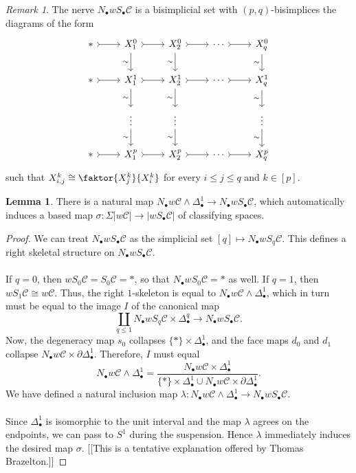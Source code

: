 \documentclass[10pt,letterpaper,cm]{nupset}
\theoremstyle{definition}
\theoremstyle{theorem}
\newtheorem{lemma}[definition]{Lemma}
\theoremstyle{remark}
\newtheorem{remark}[definition]{Remark}
\newcommand{\1}{\mathbf{1}}
\renewcommand{\c}{\mathscr{C}}
\newcommand{\0}{\vec 0}
\begin{document}
\begin{remark}
The nerve $N_{\bullet}w S_{\bullet}\c$ is a bisimplicial set with $(p,q)$-bisimplices the diagrams of the form
\[
\begin{tikzcd}
\ast \arrow[r, tail] & X_1^0 \arrow[d, "\sim"'] \arrow[r, tail] & X_2^0 \arrow[r, tail] \arrow[d, "\sim"'] & \cdots \arrow[r, tail] & X_q^0 \arrow[d, "\sim"'] \\
\ast \arrow[r, tail] & X_1^1 \arrow[d, "\sim"'] \arrow[r, tail] & X_2^1 \arrow[r, tail] \arrow[d, "\sim"'] & \cdots \arrow[r, tail] & X_q^1 \arrow[d, "\sim"'] \\
 & \vdots \arrow[d, "\sim"'] & \vdots \arrow[d, "\sim"'] &  & \vdots \arrow[d, "\sim"'] \\
\ast \arrow[r, tail] & X_1^p \arrow[r, tail] & X_2^p \arrow[r, tail] & \cdots \arrow[r, tail] & X_q^p
\end{tikzcd}
\]
such that $X^k_{i,j} \cong \faktor{X_j^k}{X_i^k}$ for every $i\leq j\leq q$ and $k\in [p]$. 
\end{remark}

\begin{lemma}
There is a natural map $N_{\bullet} w \c \land \Delta_{\bullet}^1 \to N_{\bullet} w S_{\bullet} \c$, which automatically induces a based map $\sigma : \Sigma |w \c|\to |w S_{\bullet} \c|$ of classifying spaces.
\end{lemma}
\begin{proof}
We can treat $N_{\bullet} w S_{\bullet} \c$ as the simplicial set $[q] \mapsto N_{\bullet} w S_q \c$. This defines a right skeletal structure on $N_{\bullet} w S_{\bullet} \c$. 
\\ \\ If $q = 0$, then $w S_0 \c = S_0 \c = \ast$, so that $N_{\bullet} w S_0\c = \ast$ as well. If $q= 1$, then
$w S_1 \c \cong w \c$. Thus, the right $1$-skeleton is equal to $N_{\bullet} w \c  \land \Delta_{\bullet}^1$, which in turn must be equal to the image $I$ of the canonical map $$\coprod_{q\leq 1} N_{\bullet} w S_q \c \times \Delta_{\bullet}^q \to N_{\bullet} w S_{\bullet} \c.$$ Now, the degeneracy map $s_0$ collapses $\{\ast\} \times \Delta_{\bullet}^1$, and the face maps $d_0$ and $d_1$ collapse $ N_{\bullet} w \c \times \partial{\Delta_{\bullet}^1}$. 
Therefore, $I$ must equal $$N_{\bullet} w \c  \land \Delta_{\bullet}^1  = \frac{N_{\bullet} w \c \times \Delta_{\bullet}^1}{\{\ast\} \times \Delta_{\bullet}^1 \cup N_{\bullet} w \c \times \partial{\Delta_{\bullet}^1}}.$$  We have defined a natural inclusion map $\lambda : N_{\bullet} w \c \land \Delta_{\bullet}^1 \to  N_{\bullet} w S_{\bullet} \c$.
\\  \\ Since $\Delta_{\bullet}^1$ is isomorphic to the unit interval and the map $\lambda$ agrees on the endpoints, we can pass to $S^1$ during the suspension. Hence $\lambda$ immediately induces the desired map $\sigma$. {[[This is a tentative explanation offered by Thomas Brazelton.]]}
\end{proof}
\end{document}
